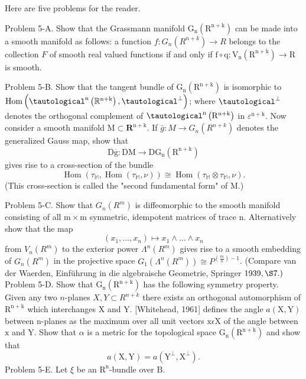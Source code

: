 \documentclass[10pt]{article}
\begin{document}
Here are five problems for the reader.

Problem 5-A. Show that the Grassmann manifold $\mathrm{G}_{\mathrm{n}}\left(\mathrm{R}^{\mathrm{n}+\mathrm{k}}\right)$ can be made into a smooth manifold as follows: a function $f: G_{n}\left(R^{n+k}\right) \rightarrow R$ belongs to the collection $F$ of smooth real valued functions if and only if $\mathrm{f} \circ \mathrm{q}: \mathrm{V}_{\mathrm{n}}\left(\mathrm{R}^{\mathrm{n}+\mathrm{k}}\right) \rightarrow \mathrm{R}$ is smooth.

Problem 5-B. Show that the tangent bundle of $\mathrm{G}_{\mathrm{n}}\left(\mathrm{R}^{\mathrm{n}+\mathrm{k}}\right)$ is isomorphic to $\operatorname{Hom}\left(\tautological^{\mathrm{n}}\left(\mathbb{R}^{\mathrm{n}+\mathrm{k}}\right), \tautological^{\perp}\right)$; where $\tautological^{\perp}$ denotes the orthogonal complement of $\tautological^{\mathrm{n}}\left(\mathrm{R}^{\mathrm{n}+\mathrm{k}}\right)$ in $\varepsilon^{\mathrm{n}+\mathrm{k}}$. Now consider a smooth manifold $\mathrm{M} \subset \mathbf{R}^{\mathrm{n}+\mathrm{k}}$. If $\bar{g}: M \rightarrow G_{n}\left(R^{n+k}\right)$ denotes the generalized Gauss map, show that
$$
\mathrm{D} \overline{\mathrm{g}}: \mathrm{DM} \rightarrow \mathrm{DG}_{\mathrm{n}}\left(\mathrm{R}^{\mathrm{n}+\mathrm{k}}\right)
$$
gives rise to a cross-section of the bundle
$$
\operatorname{Hom}\left(\tau_{\mathbb{M}}, \operatorname{Hom}\left(\tau_{\mathbb{M}}, \nu\right)\right) \cong \operatorname{Hom}\left(\tau_{\mathbb{M}} \otimes \tau_{\mathbb{M}}, \nu\right) .
$$
(This cross-section is called the "second fundamental form" of M.)

Problem 5-C. Show that $G_{n}\left(R^{m}\right)$ is diffeomorphic to the smooth manifold consisting of all $\mathrm{m} \times \mathrm{m}$ symmetric, idempotent matrices of trace $\mathrm{n}$. Alternatively show that the map
$$
\left(x_{1}, \ldots, x_{n}\right) \mapsto x_{1} \wedge \ldots \wedge x_{n}
$$
from $V_{n}\left(R^{m}\right)$ to the exterior power $\Lambda^{n}\left(R^{m}\right)$ gives rise to a smooth embedding of $G_{n}\left(R^{m}\right)$ in the projective space $G_{1}\left(\Lambda^{n}\left(R^{m}\right)\right) \cong P^{\left(\frac{m}{n}\right)-1}$. (Compare van der Waerden, Einführung in die algebraische Geometrie, Springer $1939, \S 7 .)$ Problem 5-D. Show that $\mathrm{G}_{\mathrm{n}}\left(\mathrm{R}^{\mathrm{n}+\mathrm{k}}\right)$ has the following symmetry property. Given any two $n$-planes $X, Y \subset R^{n+k}$ there exists an orthogonal automorphism of $\mathrm{R}^{\mathrm{n}+\mathrm{k}}$ which interchanges $\mathrm{X}$ and $\mathrm{Y}$. [Whitehead, 1961] defines the angle $a(\mathrm{X}, \mathrm{Y})$ between $\mathrm{n}$-planes as the maximum over all unit vectors $\mathrm{x} \epsilon \mathrm{X}$ of the angle between $\mathrm{x}$ and $\mathrm{Y}$. Show that $\alpha$ is a metric for the topological space $\mathrm{G}_{\mathrm{n}}\left(\mathrm{R}^{\mathrm{n}+\mathrm{k}}\right)$ and show that
$$
a(\mathrm{X}, \mathrm{Y})=a\left(\mathrm{Y}^{\perp}, \mathrm{X}^{\perp}\right) .
$$
Problem 5-E. Let $\xi$ be an $\mathrm{R}^{\mathrm{n}}$-bundle over $\mathrm{B}$.
\end{document}

